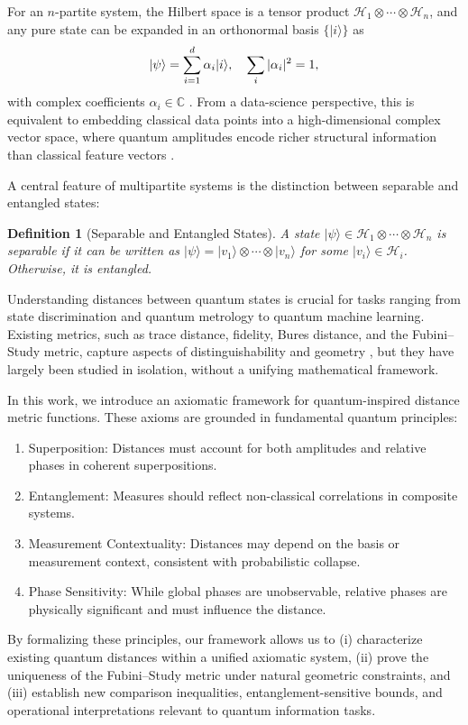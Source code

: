 \documentclass[aps,pra,reprint,nofootinbib,showpacs,superscriptaddress]{revtex4-1}
\newtheorem{definition}[theorem]{Definition}
\newcommand{\Hilbert}{\mathcal{H}}
\begin{document}
For an $n$-partite system, the Hilbert space is a tensor product $\Hilbert_1 \otimes \cdots \otimes \Hilbert_n$, and any pure state can be expanded in an orthonormal basis $\{|i\rangle\}$ as
\begin{equation}\notag
|\psi\rangle = \sum_{i=1}^{d} \alpha_i |i\rangle, \quad \sum_i |\alpha_i|^2 = 1,
\end{equation}
with complex coefficients $\alpha_i \in \mathbb{C}$ \cite{nielsen2010quantum, hayashi2017quantum}. From a data-science perspective, this is equivalent to embedding classical data points into a high-dimensional complex vector space, where quantum amplitudes encode richer structural information than classical feature vectors \cite{schuld2018supervised, wittek2014quantum}.

A central feature of multipartite systems is the distinction between separable and entangled states:

\begin{definition}[Separable and Entangled States]
A state $|\psi\rangle \in \Hilbert_1 \otimes \cdots \otimes \Hilbert_n$ is \emph{separable} if it can be written as $|\psi\rangle = |v_1\rangle \otimes \cdots \otimes |v_n\rangle$ for some $|v_i\rangle \in \Hilbert_i$. Otherwise, it is \emph{entangled}.
\end{definition}

Understanding distances between quantum states is crucial for tasks ranging from state discrimination and quantum metrology to quantum machine learning. Existing metrics, such as trace distance, fidelity, Bures distance, and the Fubini–Study metric, capture aspects of distinguishability and geometry \cite{wilde2013, bengtsson2017geometry}, but they have largely been studied in isolation, without a unifying mathematical framework.

In this work, we introduce an axiomatic framework for quantum-inspired distance metric functions. These axioms are grounded in fundamental quantum principles:
\begin{enumerate}[label=(\roman*)]
    \item {Superposition:} Distances must account for both amplitudes and relative phases in coherent superpositions.
    \item {Entanglement:} Measures should reflect non-classical correlations in composite systems.
    \item {Measurement Contextuality:} Distances may depend on the basis or measurement context, consistent with probabilistic collapse.
    \item {Phase Sensitivity:} While global phases are unobservable, relative phases are physically significant and must influence the distance.
\end{enumerate}
By formalizing these principles, our framework allows us to (i) characterize existing quantum distances within a unified axiomatic system, (ii) prove the uniqueness of the Fubini–Study metric under natural geometric constraints, and (iii) establish new comparison inequalities, entanglement-sensitive bounds, and operational interpretations relevant to quantum information tasks.
\end{document}
